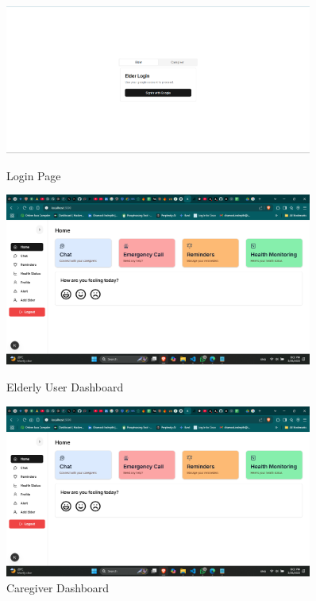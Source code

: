 \begin{figure}
    \centering
    \begin{minipage}{\textwidth}
        \centering
        \includegraphics[width=0.9\textwidth]{login.png}
        \caption{Login Page}
        \label{fig:login}
    \end{minipage}
    \vspace{5pt}
    \begin{minipage}{\textwidth}
        \centering
        \includegraphics[width=0.9\textwidth]{dashboard.png}
        \caption{Elderly User Dashboard}
        \label{fig:elderly_dashboard}
    \end{minipage}
    \vspace{5pt}
    \begin{minipage}{\textwidth}
        \centering
       \includegraphics[width=0.9\textwidth]{dashboard.png}
        \caption{Caregiver Dashboard}
        \label{fig:caregiver_dashboard}
    \end{minipage}
    \vspace{5pt}
\end{figure}

